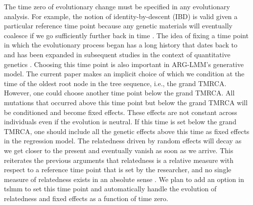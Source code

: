 The time zero of evolutionary change must be specified in any evolutionary analysis.
For example, the notion of identity-by-descent (IBD) is valid given a particular reference time point because any genetic materials will eventually coalesce if we go sufficiently further back in time \citep{Thompson2013}.
The idea of fixing a time point in which the evolutionary process began has a long history that dates back to \cite{Wright1949} and has been expanded in subsequent studies in the context of quantitative genetics \citep{weir1990gda, weir2002fstatistics, Ochoa2021, hou2023kinshiprobust}.
Choosing this time point is also important in ARG-LMM's generative model.
The current paper makes an implicit choice of which we condition at
the time of the oldest root node in the tree sequence, i.e., the grand TMRCA.
However, one could choose another time point below the grand TMRCA.
All mutations that occurred above this time point but below the grand TMRCA will be conditioned and become fixed effects.
These effects are not constant across individuals even if the evolution is neutral.
If this time is set below the grand TMRCA, 
one should include all the genetic effects above this time 
as fixed effects in the regression model.
The relatedness driven by random effects will decay as we get closer to the present and eventually vanish as soon as we arrive.
This reiterates the previous arguments that relatedness is a relative measure with respect to a reference time point that is set by the researcher,
and no single measure of relatedness exists in an absolute sense \citep{Thompson2013}.
We plan to add an option in \textsf{tslmm} to set this time point and automatically handle the evolution of relatedness and fixed effects as a function of time zero.

